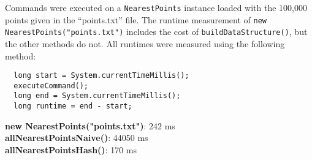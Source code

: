 \documentclass[12pt]{article}
\begin{document}
Commands were executed on a \lstinline|NearestPoints| instance loaded
with the 100,000 points given in the ``points.txt'' file. The runtime
measurement of \lstinline|new NearestPoints("points.txt")|
includes the cost of \lstinline|buildDataStructure()|, but the other
methods do not. All runtimes were measured using the following method: \\

\begin{lstlisting}
  long start = System.currentTimeMillis();
  executeCommand();
  long end = System.currentTimeMillis();
  long runtime = end - start;
\end{lstlisting}
\bigskip

\textbf{new NearestPoints("points.txt")}: 242 ms \\

\textbf{allNearestPointsNaive()}: 44050 ms \\

\textbf{allNearestPointsHash()}: 170 ms
\end{document}
